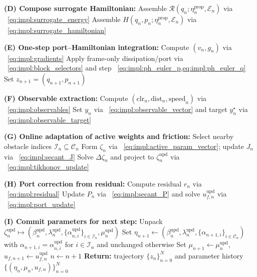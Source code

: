 \documentclass{article} %
\begin{document}
\begin{algorithm}[htbp]
\begin{algorithmic}[1]
    \State \textbf{(D) Compose surrogate Hamiltonian:} 
    \Statex \hspace{1em} Assemble $\mathcal{R}(q_n;\eta_n^{\mathrm{prop}},\mathcal{E}_n)$ via ~\cref{eq:impl:surrogate_energy}
    \Statex \hspace{1em} Assemble $H(q_n,p_n;\eta_n^{\mathrm{prop}},\mathcal{E}_n)$ via ~\cref{eq:impl:surrogate_hamiltonian}

    \State \textbf{(E) One-step port--Hamiltonian integration:}
    \State Compute $(v_n,g_n)$ via ~\cref{eq:impl:gradients}
    \State Apply frame-only dissipation/port via ~\cref{eq:impl:block_selectors} and step ~\cref{eq:impl:ph_euler_p,eq:impl:ph_euler_q}
    \State Set $z_{n+1}=(q_{n+1},p_{n+1})$

    \State \textbf{(F) Observable extraction:} 
    \State Compute $(\mathrm{clr}_n,\mathrm{dist}_n,\mathrm{speed}_n)$ via ~\cref{eq:impl:observables}
    \State Set $y_n$ via ~\cref{eq:impl:observable_vector} and target $y_n^\star$ via ~\cref{eq:impl:observable_target}

    \State \textbf{(G) Online adaptation of active weights and friction:}
    \State Select nearby obstacle indices $\mathcal{I}_n \subseteq \mathcal{C}_n$
    \State Form $\zeta_n$ via ~\cref{eq:impl:active_param_vector}; update $J_n$ via ~\cref{eq:impl:secant_J}
    \State Solve $\Delta\zeta_n$ and project to $\zeta_n^{\mathrm{upd}}$ via ~\cref{eq:impl:tikhonov_update}

    \State \textbf{(H) Port correction from residual:}
    \State Compute residual $r_n$ via ~\cref{eq:impl:residual}
    \State Update $P_n$ via ~\cref{eq:impl:secant_P} and solve $u_{f,n}^{\mathrm{upd}}$ via ~\cref{eq:impl:port_update}

    \State \textbf{(I) Commit parameters for next step:}
    \State Unpack $\zeta_n^{\mathrm{upd}}\mapsto(\beta_n^{\mathrm{upd}},\lambda_n^{\mathrm{upd}},\{\alpha_{n,i}^{\mathrm{upd}}\}_{i\in\mathcal{I}_n},\mu_n^{\mathrm{upd}})$
    \State Set $\eta_{n+1}\leftarrow(\beta_n^{\mathrm{upd}},\lambda_n^{\mathrm{upd}},\{\alpha_{n+1,i}\}_{i\in\mathcal{C}_n})$ with $\alpha_{n+1,i}{=}\alpha_{n,i}^{\mathrm{upd}}$ for $i\in\mathcal{I}_n$ and unchanged otherwise
    \State Set $\mu_{n+1}\leftarrow \mu_n^{\mathrm{upd}}$, \quad $u_{f,n+1}\leftarrow u_{f,n}^{\mathrm{upd}}$
    \State $n\leftarrow n+1$
\EndWhile
\State \textbf{Return:} trajectory $\{z_n\}_{n=0}^{N}$ and parameter history $\{(\eta_n,\mu_n,u_{f,n})\}_{n=0}^{N}$
\end{algorithmic}
\end{algorithm}
\end{document}

